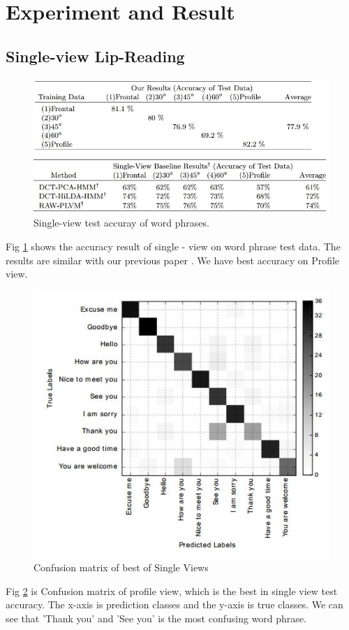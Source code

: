 \section{Experiment and Result}


\subsection{Single-view Lip-Reading}

\begin{figure}[h]
	\centering
	\includegraphics[width=\columnwidth]{fig/s1.jpg}
	\caption{Single-view test accuray of word phrases.}
	\label{fig:s1}
\end{figure}
Fig \ref{fig:s1} shows the accuracy result of single - view on word phrase test data. The results are similar with our previous paper \cite{Lee}. We have best accuracy on Profile view.

\begin{figure}[h]
	\centering
	\includegraphics[width=\columnwidth]{fig/s2.jpg}
	\caption{Confusion matrix of best of Single Views}
	\label{fig:s2}
\end{figure}
Fig \ref{fig:s2} is Confusion matrix of profile view, which is the best in single view test accuracy. The x-axis is prediction classes and the y-axis is true classes.
We can see that 'Thank you' and 'See you' is the most confusing word phrase.


